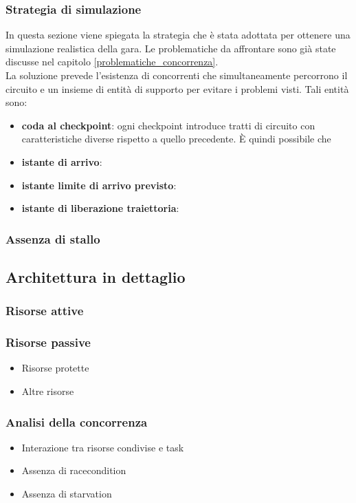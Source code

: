 \subsubsection{Strategia di simulazione}
In questa sezione viene spiegata la strategia che è stata adottata per ottenere una simulazione realistica della gara. Le problematiche da 
affrontare sono già state discusse nel capitolo \ref{problematiche_concorrenza}.\\ 
La soluzione prevede l'esistenza di concorrenti che simultaneamente percorrono il circuito e un insieme di entità di supporto per evitare 
i problemi visti. Tali entità sono:
\begin{itemize}
  \item \textbf{coda al checkpoint}: ogni checkpoint introduce tratti di circuito con caratteristiche diverse rispetto a quello precedente.
	      \`{E} quindi possibile che 
  \item \textbf{istante di arrivo}:
  \item \textbf{istante limite di arrivo previsto}:
  \item \textbf{istante di liberazione traiettoria}:
\end{itemize}
\subsubsection{Assenza di stallo}

\subsection{Architettura in dettaglio}
\subsubsection{Risorse attive}
\subsubsection{Risorse passive}
\begin{itemize}
\item{Risorse protette}
\item{Altre risorse}
\end{itemize}
\subsubsection{Analisi della concorrenza}
\begin{itemize}
\item{Interazione tra risorse condivise e task}
\item{Assenza di racecondition}
\item{Assenza di starvation}
\end{itemize}
